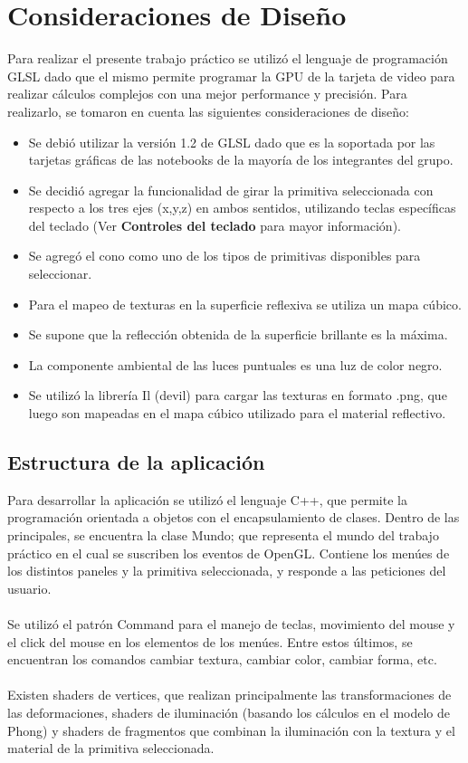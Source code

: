 \documentclass[11pt]{article}
\begin{document}
\begin{center}
\end{center}

\newpage


\section{Consideraciones de Dise\~no}
Para realizar el presente trabajo pr\'actico se utiliz\'o el lenguaje de programaci\'on GLSL dado que el mismo permite programar la GPU 
de la tarjeta de video para realizar c\'alculos complejos con una mejor performance y precisi\'on.
  Para realizarlo, se tomaron en cuenta las siguientes consideraciones de dise\~no:
\begin{itemize} 
 \item Se debi\'o utilizar la versi\'on 1.2 de GLSL dado que es la soportada por las tarjetas gr\'aficas de las notebooks de la mayor\'ia de 
los integrantes del grupo.
 \item Se decidi\'o agregar la funcionalidad de girar la primitiva seleccionada con respecto a los tres ejes (x,y,z) en ambos sentidos, utilizando teclas espec\'ificas del 
teclado (Ver {\bf Controles del teclado} para mayor informaci\'on).
 \item Se agreg\'o el cono como uno de los tipos de primitivas disponibles para seleccionar.
 \item Para el mapeo de texturas en la superficie reflexiva se utiliza un mapa c\'ubico.
 \item Se supone que la reflecci\'on obtenida de la superficie brillante es la m\'axima.
 \item La componente ambiental de las luces puntuales es una luz de color negro.
 \item Se utiliz\'o la librer\'ia Il (devil) para cargar las texturas en formato .png, que luego son mapeadas en el mapa c\'ubico utilizado para el 
material reflectivo.
\end{itemize}


\subsection{Estructura de la aplicaci\'on}
Para desarrollar la aplicaci\'on se utiliz\'o el lenguaje C++, que permite la programaci\'on orientada a objetos con el encapsulamiento de clases. 
Dentro de las principales, se encuentra la clase Mundo; que representa el mundo del trabajo pr\'actico en el cual se suscriben los eventos de OpenGL. 
Contiene los men\'ues de los distintos paneles y la primitiva seleccionada, y responde a las peticiones del usuario. \\\\
 Se utiliz\'o el patr\'on Command para el manejo de teclas, movimiento del mouse y el click del mouse en los elementos de los men\'ues. 
Entre estos \'ultimos, se encuentran los comandos cambiar textura, cambiar color, cambiar forma, etc.\\\\
 Existen shaders de vertices, que realizan principalmente las transformaciones de las deformaciones, shaders de iluminaci\'on (basando los c\'alculos en el modelo de Phong) y
shaders de fragmentos que combinan la iluminaci\'on con la textura y el material de la primitiva seleccionada. 
\end{document}
